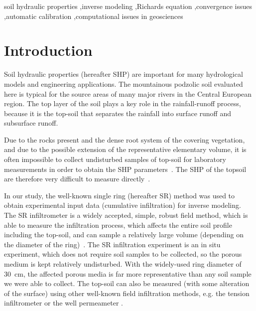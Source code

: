 \documentclass[review,times,3p,twocolumn,10pt]{elsarticle}
\begin{document}
\begin{frontmatter}
\begin{abstract}

\end{abstract}

\begin{keyword}
soil hydraulic properties \sep inverse modeling \sep Richards equation \sep convergence issues  \sep automatic calibration \sep computational issues in geosciences  


\end{keyword}

\end{frontmatter}

\linenumbers

\section{Introduction}%

Soil hydraulic properties (hereafter SHP) are important for many hydrological models and engineering applications. The mountainous podzolic soil evaluated here is typical for the source areas of many major rivers in the Central European region. The top layer of the soil plays a key role in the rainfall-runoff process, because it is the top-soil that separates the rainfall into surface runoff and subsurface runoff. 


Due to the rocks present and the dense root system of the covering vegetation, and due to the possible extension of the representative elementary volume, it is often impossible to collect undisturbed samples of top-soil for laboratory measurements in order to obtain the SHP parameters~\citep{Jacka1}. The SHP of the topsoil are therefore very difficult to measure directly~\citep{Fodor, Jacka1}. 


In our study, the well-known single ring (hereafter SR) method was used to obtain experimental input data (cumulative infiltration) for inverse modeling. The SR infiltrometer is a widely accepted, simple, robust field method, which is able to measure the infiltration process, which affects the entire soil profile including the top-soil,  and can sample a relatively large volume (depending on the diameter of the ring)~\citep{Cheng,ReynoldsWD}.  The SR infiltration experiment is an in situ experiment, which does not require soil samples to be collected, so the porous medium is kept relatively undisturbed. With the widely-used ring diameter of 30~cm, the affected porous media is far more representative than any soil sample we were able to collect. The top-soil can also be measured (with some alteration of the surface) using other well-known field infiltration methods, e.g. the tension infiltrometer or the well permeameter  \citep{AnguloJaramillo,ReynoldsWDGP}. 
\end{document}
